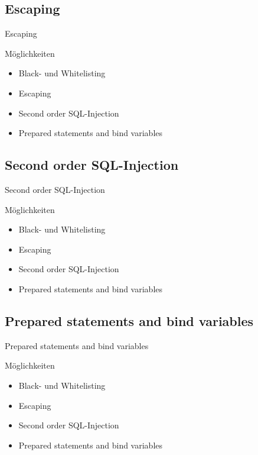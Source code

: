 \subsection{Escaping}
\begin{frame}{Escaping}
\begin{block}{Möglichkeiten}
\begin{itemize}
\item Black- und Whitelisting
\item Escaping
\item Second order SQL-Injection
\item Prepared statements and bind variables
\end{itemize}
\end{block}
\end{frame}

\subsection{Second order SQL-Injection}
\begin{frame}{Second order SQL-Injection}
\begin{block}{Möglichkeiten}
\begin{itemize}
\item Black- und Whitelisting
\item Escaping
\item Second order SQL-Injection
\item Prepared statements and bind variables
\end{itemize}
\end{block}
\end{frame}

\subsection{Prepared statements and bind variables}
\begin{frame}{Prepared statements and bind variables}
\begin{block}{Möglichkeiten}
\begin{itemize}
\item Black- und Whitelisting
\item Escaping
\item Second order SQL-Injection
\item Prepared statements and bind variables
\end{itemize}
\end{block}
\end{frame}

